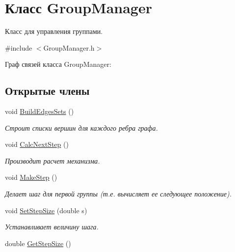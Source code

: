 \hypertarget{class_group_manager}{
\section{Класс GroupManager}
\label{class_group_manager}
}


Класс для управления группами.  




{\ttfamily \#include $<$GroupManager.h$>$}



Граф связей класса GroupManager:
\subsection*{Открытые члены}
\begin{DoxyCompactItemize}
\item 
void \hyperlink{class_group_manager_a94be481fda67cbbf340b9a32c1f52f0d}{BuildEdgesSets} ()
\begin{DoxyCompactList}\small\item\em Строит списки вершин для каждого ребра графа. \item\end{DoxyCompactList}\item 
void \hyperlink{class_group_manager_a21932a91e45badc4247884883d8c91b0}{CalcNextStep} ()
\begin{DoxyCompactList}\small\item\em Производит расчет механизма. \item\end{DoxyCompactList}\item 
void \hyperlink{class_group_manager_aa7f89b216d9d7e090f256c99a868f3c7}{MakeStep} ()
\begin{DoxyCompactList}\small\item\em Делает шаг для первой группы (т.е. вычисляет ее следующее положение). \item\end{DoxyCompactList}\item 
void \hyperlink{class_group_manager_a94361a7ba680e812f0b340efe7d109f4}{SetStepSize} (double s)
\begin{DoxyCompactList}\small\item\em Устанавливает величину шага. \item\end{DoxyCompactList}\item 
double \hyperlink{class_group_manager_ae1823aa7f061fef2ae743ff54292e877}{GetStepSize} ()

\end{DoxyCompactItemize}
